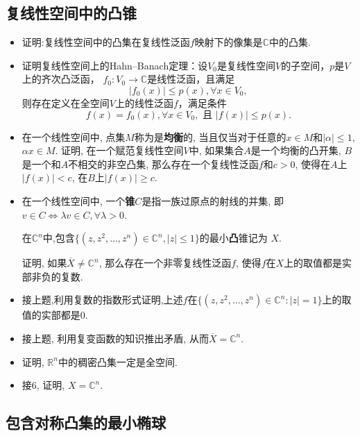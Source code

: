 \subsection*{复线性空间中的凸锥}
\begin{itemize}
	\item[1]证明:复线性空间中的凸集在复线性泛函$f$映射下的像集是$\mathbb{C}$中的凸集.
	\item[2]证明复线性空间上的Hahn--Banach定理：设$V_0$是复线性空间$V$的子空间，$p$是$V$上的齐次凸泛函，
    $f_0:V_0\rightarrow \mathbb{C}$是线性泛函，且满足
	$$|f_0(x)|\leqslant p(x), \forall x \in V_0,$$
	则存在定义在全空间$V$上的线性泛函$f$，满足条件
	$$f(x)=f_0(x), \forall x \in V_0, \text{ 且 }|f(x)|\leqslant p(x).$$
	\item[3]在一个线性空间中, 点集$M$称为是\textbf{均衡}的, 
    当且仅当对于任意的$x\in M$和$|\alpha|\leqslant 1$, $\alpha x\in M.$ 
    证明, 在一个赋范复线性空间$V$中, 如果集合$A$是一个均衡的凸开集, $B$是一个和$A$不相交的非空凸集, 
    那么存在一个复线性泛函$f$和$c > 0$, 使得在$A$上$|f(x)| < c$, 在$B$上$|f(x)|\geqslant c$.
	\item[4]在一个线性空间中, 一个\textbf{锥}$C$是指一族过原点的射线的并集, 
    即$v\in C \Leftrightarrow \lambda v \in C, \forall \lambda > 0.$\par
	在$\mathbb{C}^n$中,包含$\{(z, z^2, \dots, z^n)\in \mathbb{C}^n, |z| \leqslant 1\}$的最小\textbf{凸}锥记为 $X$.\par
	证明, 如果$\overline {X} \neq \mathbb{C}^n$, 那么存在一个非零复线性泛函$f$, 使得$f$在$X$上的取值都是实部非负的复数.
	\item[5]接上题,利用复数的指数形式证明,上述$f$在$\{(z, z^2, \dots, z^n)\in \mathbb{C}^n:|z| =1\}$上的取值的实部都是$0$.
	\item[6]接上题, 利用复变函数的知识推出矛盾, 从而$\overline X = \mathbb{C}^n$.
	\item[7]证明, $\mathbb{R}^n$中的稠密凸集一定是全空间.
	\item[8]接6, 证明, $X = \mathbb{C}^n$.
\end{itemize}

\subsection*{包含对称凸集的最小椭球}

